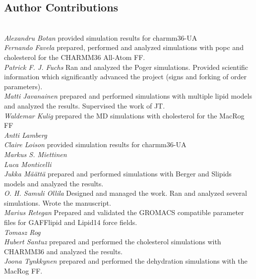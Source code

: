 \documentclass[journal=jacsat,manuscript=article]{achemso}
\begin{document}
\subsection{Author Contributions}
 \\
{\it Alexandru Botan} provided simulation results for charmm36-UA\\
{\it Fernando Favela} prepared, performed and analyzed simulations
with popc and cholesterol for the CHARMM36 All-Atom FF. \\
{\it Patrick F. J. Fuchs} Ran and analyzed the Poger simulations. Provided scientific information which significantly advanced the project (signs and forking of order parameters). \\
{\it Matti Javanainen} prepared and performed simulations with multiple lipid models and analyzed the results. Supervised the work of JT.\\
{\it Waldemar Kulig} prepared the MD simulations with cholesterol for the MacRog FF \\
{\it Antti Lamberg}  \\
{\it Claire Loison} provided simulation results for charmm36-UA \\
{\it Markus S. Miettinen}  \\
{\it Luca Monticelli}  \\
{\it Jukka M{\"a}{\"a}tt{\"a}}  prepared and performed simulations with Berger and Slipids models and analyzed the results.\\
{\it O. H. Samuli Ollila} Designed and managed the work. Ran and analyzed several simulations. Wrote the manuscript.  \\
{\it Marius Retegan} Prepared and validated the GROMACS compatible parameter files for GAFFlipid and Lipid14 force fields.\\
{\it Tomasz Rog}  \\
{\it Hubert Santuz} prepared and performed the cholesterol simulations with CHARMM36 and analyzed the results. \\
{\it Joona Tynkkynen} prepared and performed the dehydration simulations with the MacRog FF.\\




\end{document}
